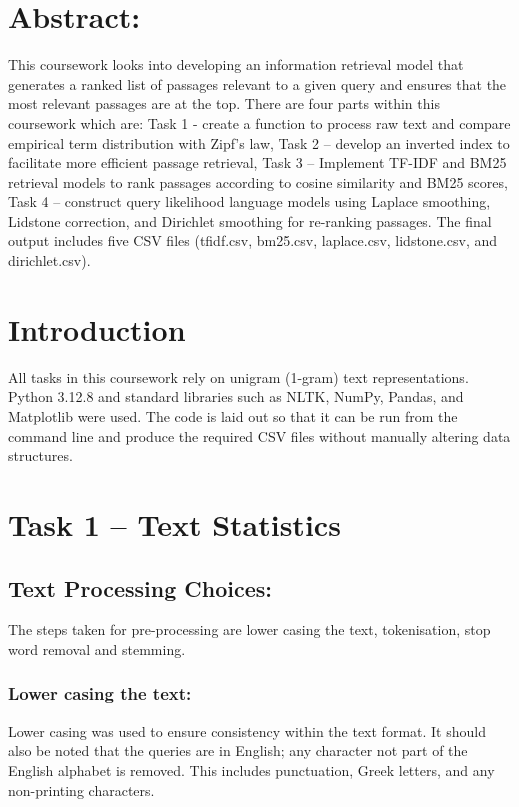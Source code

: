\documentclass[10pt]{article}
\begin{document}

\noindent
\section*{Abstract:} This coursework looks into developing an information retrieval model that generates a ranked list of passages relevant to a given query and ensures that the most relevant passages are at the top. There are four parts within this coursework which are: Task 1 - create a function to process raw text and compare empirical term distribution with Zipf’s law, Task 2 – develop an inverted index to facilitate more efficient passage retrieval, Task 3 – Implement TF-IDF and BM25 retrieval models to rank passages according to cosine similarity and BM25 scores, Task 4 – construct query likelihood language models using Laplace smoothing, Lidstone correction, and Dirichlet smoothing for re-ranking passages. The final output includes five CSV files (tfidf.csv, bm25.csv, laplace.csv, lidstone.csv, and dirichlet.csv).

\section*{Introduction}
All tasks in this coursework rely on unigram (1-gram) text representations. Python 3.12.8 and standard libraries such as NLTK, NumPy, Pandas, and Matplotlib were used. The code is laid out so that it can be run from the command line and produce the required CSV files without manually altering data structures.

\section {Task 1 -- Text Statistics}
\subsection{Text Processing Choices:}
The steps taken for pre-processing are lower casing the text, tokenisation, stop word removal and stemming.

\subsubsection{Lower casing the text:}
Lower casing was used to ensure consistency within the text format. It should also be noted that the queries are in English; any character not part of the English alphabet is removed. This includes punctuation, Greek letters, and any non-printing characters.
\end{document}
